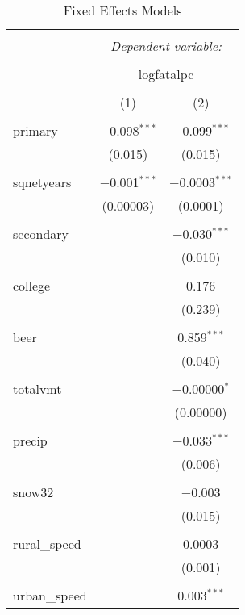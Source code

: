 \documentclass{article}
\begin{document}
\begin{table}[!htbp] \centering 
  \caption{Fixed Effects Models} 
  \label{} 
\footnotesize 
\begin{tabular}{@{\extracolsep{5pt}}lcc} 
\\[-1.8ex]\hline 
\hline \\[-1.8ex] 
 & \multicolumn{2}{c}{\textit{Dependent variable:}} \\ 
\cline{2-3} 
\\[-1.8ex] & \multicolumn{2}{c}{logfatalpc} \\ 
\\[-1.8ex] & (1) & (2)\\ 
\hline \\[-1.8ex] 
 primary & $-$0.098$^{***}$ & $-$0.099$^{***}$ \\ 
  & (0.015) & (0.015) \\ 
  & & \\ 
 sqnetyears & $-$0.001$^{***}$ & $-$0.0003$^{***}$ \\ 
  & (0.00003) & (0.0001) \\ 
  & & \\ 
 secondary &  & $-$0.030$^{***}$ \\ 
  &  & (0.010) \\ 
  & & \\ 
 college &  & 0.176 \\ 
  &  & (0.239) \\ 
  & & \\ 
 beer &  & 0.859$^{***}$ \\ 
  &  & (0.040) \\ 
  & & \\ 
 totalvmt &  & $-$0.00000$^{*}$ \\ 
  &  & (0.00000) \\ 
  & & \\ 
 precip &  & $-$0.033$^{***}$ \\ 
  &  & (0.006) \\ 
  & & \\ 
 snow32 &  & $-$0.003 \\ 
  &  & (0.015) \\ 
  & & \\ 
 rural\_speed &  & 0.0003 \\ 
  &  & (0.001) \\ 
  & & \\ 
 urban\_speed &  & 0.003$^{***}$ \\ 

\end{tabular}
\end{table}
\end{document}
